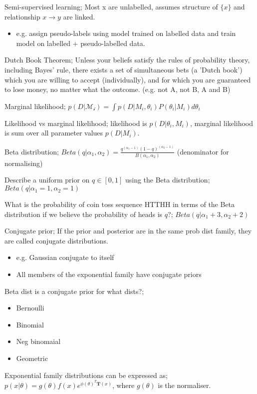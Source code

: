 \documentclass{article}
\begin{document}
Semi-supervised learning; Most x are unlabelled, assumes structure of $\{x\}$ and relationship $x\to y$ are linked. \begin{itemize} \item e.g. assign pseudo-labels using model trained on labelled data and train model on labelled + pseudo-labelled data.  \end{itemize}
	
Dutch Book Theorem; Unless your beliefs satisfy the rules of probability theory, including Bayes' rule, there exists a set of simultaneous bets (a 'Dutch book') which you are willing to accept (individually), and for which you are guaranteed to lose money, no matter what the outcome. (e.g. not A, not B, A and B)

Marginal likelihood; $p(D|\mathcal{M_i})=\int p(D|M_i, \theta_i)P(\theta_i|M_i)d\theta_i$

Likelihood vs marginal likelihood; likelihood is $p(D|\theta_i, M_i)$, marginal likelihood is sum over all parameter values $p(D|M_i)$.

Beta distribution; $Beta(q|\alpha_1, \alpha_2) = \frac{q^{(\alpha_1 - 1)}(1-q)^{(\alpha_2-1)}}{B(\alpha_1,\alpha_2)}$ (denominator for normalising)

Describe a uniform prior on $q\in[0,1]$ using the Beta distribution; $Beta(q|\alpha_1=1,\alpha_2=1)$


What is the probability of coin toss sequence HTTHH in terms of the Beta distribution if we believe the probability of heads is $q$?; $Beta(q|\alpha_1 + 3, \alpha_2 + 2)$

Conjugate prior; If the prior and posterior are in the same prob dist family, they are called conjugate distributions. \begin{itemize}
	\item e.g. Gaussian conjugate to itself
	\item All members of the exponential family have conjugate priors
\end{itemize}

Beta dist is a conjugate prior for what dists?; \begin{itemize}
	\item Bernoulli
	\item Binomial \item Neg binomaial \item Geometric
\end{itemize}

Exponential family distributions can be expressed as; $p(x|\theta) = g(\theta)f(x)e^{\phi(\theta)^T\mathbf{T}(x)}$, where $g(\theta)$ is the normaliser.
\end{document}
